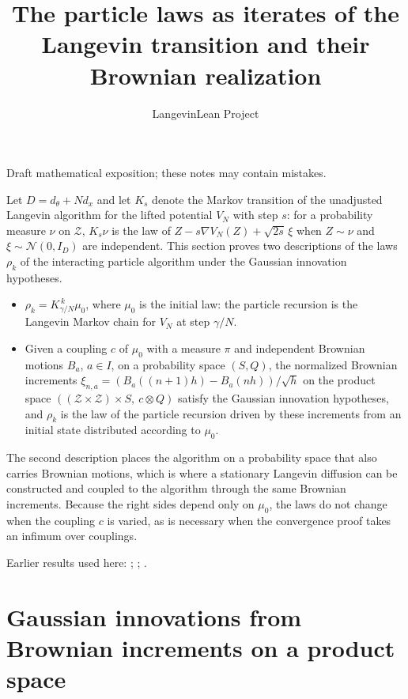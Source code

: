 \documentclass[11pt,a4paper]{article}
\title{\texorpdfstring{The particle laws as iterates of the Langevin transition and their Brownian realization}{The particle laws as iterates of the Langevin transition and their Brownian realization}}
\author{LangevinLean Project}
\date{}
\begin{document}
\maketitle
Draft mathematical exposition; these notes may contain mistakes.


Let \(D=d_\theta+Nd_x\) and let \(K_s\) denote the Markov transition of the unadjusted Langevin algorithm for the lifted potential \(V_N\) with step \(s\): for a probability measure \(\nu\) on \(\mathcal Z\), \(K_s\nu\) is the law of \(Z-s\nabla V_N(Z)+\sqrt{2s}\,\xi\) when \(Z\sim\nu\) and \(\xi\sim\mathcal N(0,I_D)\) are independent. This section proves two descriptions of the laws \(\rho_k\) of the interacting particle algorithm under the Gaussian innovation hypotheses.



\begin{itemize}


\item \(\rho_k=K_{\gamma/N}^{\,k}\mu_0\), where \(\mu_0\) is the initial law: the particle recursion is the Langevin Markov chain for \(V_N\) at step \(\gamma/N\).

\item Given a coupling \(c\) of \(\mu_0\) with a measure \(\pi\) and independent Brownian motions \(B_a\), \(a\in I\), on a probability space \((S,Q)\), the normalized Brownian increments \(\xi_{n,a}=(B_a((n+1)h)-B_a(nh))/\sqrt h\) on the product space \(((\mathcal Z\times\mathcal Z)\times S,\ c\otimes Q)\) satisfy the Gaussian innovation hypotheses, and \(\rho_k\) is the law of the particle recursion driven by these increments from an initial state distributed according to \(\mu_0\).

\end{itemize}



The second description places the algorithm on a probability space that also carries Brownian motions, which is where a stationary Langevin diffusion can be constructed and coupled to the algorithm through the same Brownian increments. Because the right sides depend only on \(\mu_0\), the laws do not change when the coupling \(c\) is varied, as is necessary when the convergence proof takes an infimum over couplings.



Earlier results used here: \cite[Section~3.32]{LangevinLean2026ULASC}; \cite[Section~3.42]{LangevinLean2026ULASC}; \cite[Section~3.41]{LangevinLean2026ULASC}.

\section{\texorpdfstring{Gaussian innovations from Brownian increments on a product space}{Gaussian innovations from Brownian increments on a product space}}
\end{document}
